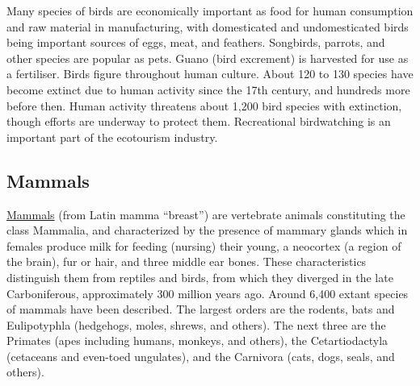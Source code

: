 Many species of birds are economically important as food for human consumption and raw material in manufacturing, with domesticated and undomesticated birds being important sources of eggs, meat, and feathers. Songbirds, parrots, and other species are popular as pets. Guano (bird excrement) is harvested for use as a fertiliser. Birds figure throughout human culture. About 120 to 130 species have become extinct due to human activity since the 17th century, and hundreds more before then. Human activity threatens about 1,200 bird species with extinction, though efforts are underway to protect them. Recreational birdwatching is an important part of the ecotourism industry.

\hypertarget{mammals}{%
\subsection{Mammals}\label{mammals}}

\href{https://en.wikipedia.org/wiki/Mammal}{Mammals} (from Latin mamma ``breast'') are vertebrate animals constituting the class Mammalia, and characterized by the presence of mammary glands which in females produce milk for feeding (nursing) their young, a neocortex (a region of the brain), fur or hair, and three middle ear bones. These characteristics distinguish them from reptiles and birds, from which they diverged in the late Carboniferous, approximately 300 million years ago. Around 6,400 extant species of mammals have been described. The largest orders are the rodents, bats and Eulipotyphla (hedgehogs, moles, shrews, and others). The next three are the Primates (apes including humans, monkeys, and others), the Cetartiodactyla (cetaceans and even-toed ungulates), and the Carnivora (cats, dogs, seals, and others).



